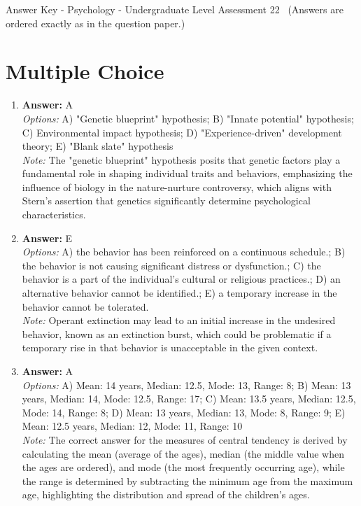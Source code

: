 \documentclass[12pt]{article}
\begin{document}
\begin{center}
Answer Key - Psychology - Undergraduate Level Assessment 22 \
\small (Answers are ordered exactly as in the question paper.)
\end{center}

\section*{Multiple Choice}
\begin{enumerate}[label=\arabic*.]
\item \textbf{Answer:} A
\\ \textit{Options:} A) "Genetic blueprint" hypothesis; B) "Innate potential" hypothesis; C) Environmental impact hypothesis; D) "Experience-driven" development theory; E) "Blank slate" hypothesis
\\ \textit{Note:} The "genetic blueprint" hypothesis posits that genetic factors play a fundamental role in shaping individual traits and behaviors, emphasizing the influence of biology in the nature-nurture controversy, which aligns with Stern's assertion that genetics significantly determine psychological characteristics.
\item \textbf{Answer:} E
\\ \textit{Options:} A) the behavior has been reinforced on a continuous schedule.; B) the behavior is not causing significant distress or dysfunction.; C) the behavior is a part of the individual's cultural or religious practices.; D) an alternative behavior cannot be identified.; E) a temporary increase in the behavior cannot be tolerated.
\\ \textit{Note:} Operant extinction may lead to an initial increase in the undesired behavior, known as an extinction burst, which could be problematic if a temporary rise in that behavior is unacceptable in the given context.
\item \textbf{Answer:} A
\\ \textit{Options:} A) Mean: 14 years, Median: 12.5, Mode: 13, Range: 8; B) Mean: 13 years, Median: 14, Mode: 12.5, Range: 17; C) Mean: 13.5 years, Median: 12.5, Mode: 14, Range: 8; D) Mean: 13 years, Median: 13, Mode: 8, Range: 9; E) Mean: 12.5 years, Median: 12, Mode: 11, Range: 10
\\ \textit{Note:} The correct answer for the measures of central tendency is derived by calculating the mean (average of the ages), median (the middle value when the ages are ordered), and mode (the most frequently occurring age), while the range is determined by subtracting the minimum age from the maximum age, highlighting the distribution and spread of the children's ages.

\end{enumerate}
\end{document}
